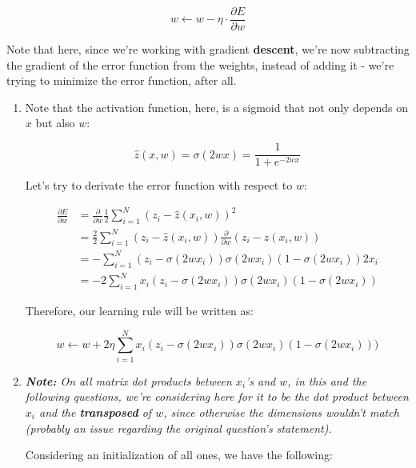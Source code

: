 \documentclass[12pt]{article}
\begin{document}
\begin{enumerate}[leftmargin=\labelsep]
  $$
    w \leftarrow w - \eta \cdot \frac{\partial E}{\partial w}
  $$

  Note that here, since we're working with gradient \textbf{descent}, we're now
  subtracting the gradient of the error function from the weights, instead of
  adding it - we're trying to minimize the error function, after all.

  \begin{enumerate}
    \item {
          Note that the activation function, here, is a sigmoid that not only depends
          on $x$ but also $w$:

          $$
            \hat{z}(x, w) = \sigma(2wx) =  \frac{1}{1 + e^{-2 w x}}
          $$

          Let's try to derivate the error function with respect to $w$:

          \begin{align*}
            \frac{\partial E}{\partial w} & = \frac{\partial}{\partial w} \frac{1}{2} \sum_{i=1}^N (z_i - \hat{z}(x_i, w))^2                       \\
                                          & = \frac{2}{2} \sum_{i=1}^N (z_i - \hat{z}(x_i, w)) \frac{\partial}{\partial w} (z_i - \hat{z}(x_i, w)) \\
                                          & = - \sum_{i=1}^N (z_i - \sigma(2wx_i)) \sigma(2wx_i) (1 - \sigma(2wx_i)) 2x_i                          \\
                                          & = -2 \sum_{i=1}^N x_i (z_i - \sigma(2wx_i)) \sigma(2wx_i) (1 - \sigma(2wx_i))
          \end{align*}

          Therefore, our learning rule will be written as:

          $$
            w \leftarrow w + 2\eta \sum_{i=1}^N x_i (z_i - \sigma(2wx_i)) \sigma(2wx_i) (1 - \sigma(2wx_i)))
          $$
          }
    \item {

          \textit{\textbf{Note:} On all matrix dot products between $x_i$'s and $w$, in this and
            the following questions, we're considering here for it to be the dot product between
            $x_i$ and the \textbf{transposed} of $w$, since otherwise the dimensions wouldn't match
            (probably an issue regarding the original question's statement).}

          Considering an initialization of all ones, we have the following:

}
\end{enumerate}
\end{enumerate}
\end{document}
